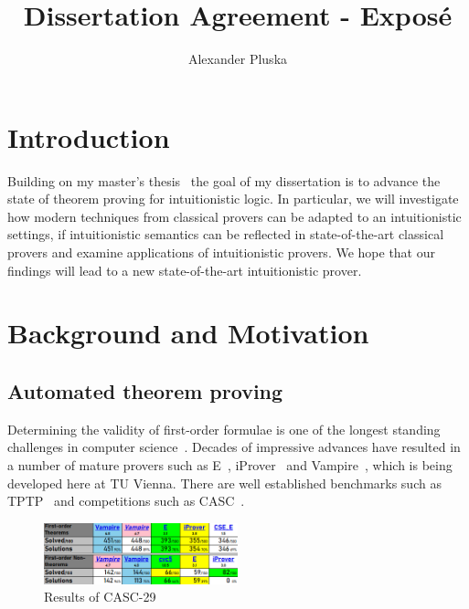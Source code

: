 \documentclass{article}
\author{Alexander Pluska}
\title{Dissertation Agreement - Exposé}
\theoremstyle{definition}
\theoremstyle{definition}
\theoremstyle{definition}
\theoremstyle{definition}
\theoremstyle{definition}
\theoremstyle{definition}
\theoremstyle{definition}
\newcommand{\0}{\mathbf 0}
\newcommand{\1}{\mathbf 1}
\begin{document}
	

	\maketitle

	\section{Introduction}
	
	Building on my master's thesis~\cite{thesis} the goal of my dissertation is to advance the state of theorem proving for intuitionistic logic. In particular, we will investigate how modern techniques from classical provers can be adapted to an intuitionistic settings, if intuitionistic semantics can be reflected in state-of-the-art classical provers and examine applications of intuitionistic provers. We hope that our findings will lead to a new state-of-the-art intuitionistic prover.

	\section{Background and Motivation}

	\subsection{Automated theorem proving}


	Determining the validity of first-order formulae is one of the longest standing challenges in computer science~\cite{robinson1965machine}. Decades of impressive advances have resulted in a number of mature provers such as E~\cite{schulz2002brainiac}, iProver~\cite{korovin2008iprover} and Vampire~\cite{kovacs2013first}, which is being developed here at TU Vienna. There are well established benchmarks such as TPTP~\cite{tptp} and competitions such as CASC~\cite{casc}.
	
	\begin{figure}
		\includegraphics[width=0.5\textwidth]{CASC29.png}
		\caption{Results of CASC-29}
	\end{figure}
\end{document}
